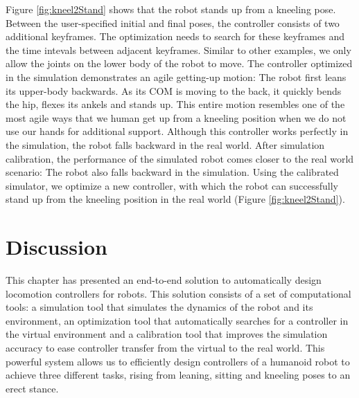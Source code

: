 Figure \ref{fig:kneel2Stand} shows that the robot stands up from a kneeling pose. Between the user-specified initial and final poses, the controller consists of two additional keyframes. The optimization needs to search for these keyframes and the time intevals between adjacent keyframes. Similar to other examples, we only allow the joints on the lower body of the robot to move. The controller optimized in the simulation demonstrates an agile getting-up motion: The robot first leans its upper-body backwards. As its COM is moving to the back, it quickly bends the hip, flexes its ankels and stands up. This entire motion resembles one of the most agile ways that we human get up from a kneeling position when we do not use our hands for additional support. Although this controller works perfectly in the simulation, the robot falls backward in the real world. After simulation calibration, the performance of the simulated robot comes closer to the real world scenario: The robot also falls backward in the simulation. Using the calibrated simulator, we optimize a new controller, with which the robot can successfully stand up from the kneeling position in the real world (Figure \ref{fig:kneel2Stand}).

\section{Discussion}

This chapter has presented an end-to-end solution to automatically design locomotion controllers for robots. This solution consists of a set of computational tools: a simulation tool that simulates the dynamics of the robot and its environment, an optimization tool that automatically searches for a controller in the virtual environment and a calibration tool that improves the simulation accuracy to ease controller transfer from the virtual to the real world. This powerful system allows us to efficiently design controllers of a humanoid robot to achieve three different tasks, rising from leaning, sitting and kneeling poses to an erect stance.

